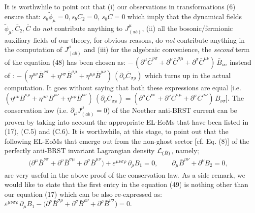 \documentclass[12pt]{article}
\begin{document}
It is worthwhile to point out that (i) our observations in 
transformations (6) ensure that: $s_b \widetilde \phi_\mu = 0, s_b \bar C_2 = 0, \, s_b \bar C = 0$ which
imply that the dynamical fields $\widetilde \phi_\mu, \bar C_2, \bar C$ do {\it not} contribute anything to $J^\mu_{(ab)} $, (ii) all the
bosonic/fermionic auxiliary fields of our theory, for obvious reasons, do {\it not} contribute anything in the computation of $J^\mu_{(ab)} $
and (iii) for the algebraic convenience, the {\it second} term of the equation (48) has been chosen as:
$- \, (\partial^\mu  \bar C^{\nu\sigma} + \partial^\nu  \bar C^{\sigma\mu} + \partial^\sigma \bar C^{\mu\nu})\, \bar B_{\nu\sigma} $
instead of : $-\, (\eta^{\mu\nu}  \bar B^{\nu\sigma} + \eta^{\nu\sigma}  \bar B^{\sigma\mu} 
+ \eta^{\mu\rho} \bar B^{\mu\nu})\, (\partial _\nu \bar C_{\sigma\rho})$ which turns up in the actual computation.
It goes without saying that both these expressions are equal [i.e. $(\eta^{\mu\nu}  \bar B^{\sigma\rho} + \eta^{\mu\sigma} \bar B^{\rho\nu} 
+ \eta^{\mu\rho} \bar B^{\nu\sigma})\, (\partial_\nu \bar C_{\sigma\rho})
= (\partial^\mu \bar C^{\nu\sigma} + \partial^\nu \bar C^{\sigma\mu} + \partial^\sigma \bar C^{\mu\nu})\, \bar B_{\nu\sigma} $].
The conservation law (i.e. $\partial_\mu J^\mu_{(ab)} = 0$) of the Noether anti-BRST current can be proven by taking into account the appropriate EL-EoMs that
have been listed in (17), (C.5) and (C.6). It is worthwhile, at this stage, to point out that the following EL-EoMs that emerge out from the non-ghost sector [cf. Eq. (8)] of the perfectly anti-BRST invariant Lagrangian density ${\cal L}_{(\bar B)} $, namely;
\begin{eqnarray}\label{49}
\big (\partial^\mu \bar B^{\nu\sigma} + \partial^\nu \bar B^{\sigma\mu}  + \partial^\sigma \bar B^{\mu\nu} \big ) 
+ \varepsilon^{\mu\nu\sigma\rho}\, \partial_\rho B_1 = 0, \qquad
\partial_\mu \bar  B^{\mu\nu} + \partial^\nu B_2 = 0,
\end{eqnarray}
 are very useful in the above proof of the conservation law. As a side remark, we would like to state that the first entry in the equation  (49)
is nothing other than our equation (17) which can be also re-expressed as: $\varepsilon^{\mu\nu\sigma\rho}\, \partial_\mu B_1 
- \big (\partial^\nu \bar B^{\sigma\rho} + \partial^\sigma \bar B^{\rho\nu}  + \partial^\rho \bar B^{\nu\sigma} \big )  = 0$. 
\end{document}
